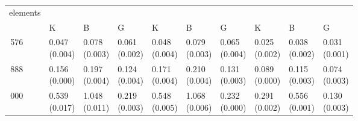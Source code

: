 \begin{table}[H]\centering\begin{tabular}{>{\centering\arraybackslash}m{1.2cm}|>{\centering\arraybackslash}m{1.25cm}>{\centering\arraybackslash}m{1.25cm}>{\centering\arraybackslash}m{1.25cm}|>{\centering\arraybackslash}m{1.25cm}>{\centering\arraybackslash}m{1.25cm}>{\centering\arraybackslash}m{1.25cm}|>{\centering\arraybackslash}m{1.25cm}>{\centering\arraybackslash}m{1.25cm}>{\centering\arraybackslash}m{1.25cm}}
\toprule
elements & \multicolumn{3}{|c}{gravity} & \multicolumn{3}{|c}{traction} & \multicolumn{3}{|c}{compression} \\
 & K & B & G & K & B & G & K & B & G \\
\midrule
24\,576 & \makecell{0.047\\[-4pt](0.004)} & \makecell{0.078\\[-4pt](0.003)} & \makecell{0.061\\[-4pt](0.002)} & \makecell{0.048\\[-4pt](0.004)} & \makecell{0.079\\[-4pt](0.003)} & \makecell{0.065\\[-4pt](0.004)} & \makecell{0.025\\[-4pt](0.002)} & \makecell{0.038\\[-4pt](0.002)} & \makecell{0.031\\[-4pt](0.001)} \\
63\,888 & \makecell{0.156\\[-4pt](0.000)} & \makecell{0.197\\[-4pt](0.004)} & \makecell{0.124\\[-4pt](0.004)} & \makecell{0.171\\[-4pt](0.004)} & \makecell{0.210\\[-4pt](0.004)} & \makecell{0.131\\[-4pt](0.003)} & \makecell{0.089\\[-4pt](0.000)} & \makecell{0.115\\[-4pt](0.003)} & \makecell{0.074\\[-4pt](0.003)} \\
162\,000 & \makecell{0.539\\[-4pt](0.017)} & \makecell{1.048\\[-4pt](0.011)} & \makecell{0.219\\[-4pt](0.003)} & \makecell{0.548\\[-4pt](0.005)} & \makecell{1.068\\[-4pt](0.006)} & \makecell{0.232\\[-4pt](0.000)} & \makecell{0.291\\[-4pt](0.002)} & \makecell{0.556\\[-4pt](0.001)} & \makecell{0.130\\[-4pt](0.003)} \\

\end{tabular}
\end{table}

